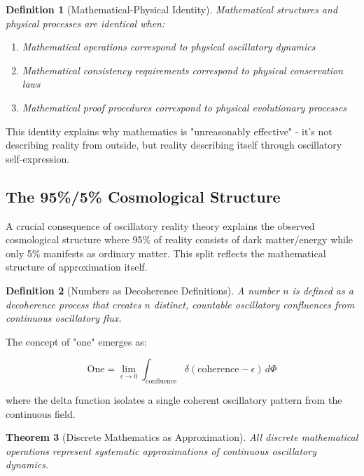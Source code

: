 \documentclass[11pt,a4paper]{article}
\newtheorem{theorem}{Theorem}[section]
\newtheorem{definition}[theorem]{Definition}
\theoremstyle{remark}
\begin{document}
\begin{definition}[Mathematical-Physical Identity]
Mathematical structures and physical processes are identical when:
\begin{enumerate}
\item Mathematical operations correspond to physical oscillatory dynamics
\item Mathematical consistency requirements correspond to physical conservation laws
\item Mathematical proof procedures correspond to physical evolutionary processes
\end{enumerate}
\end{definition}

This identity explains why mathematics is "unreasonably effective" - it's not describing reality from outside, but reality describing itself through oscillatory self-expression.

\subsection{The 95\%/5\% Cosmological Structure}

A crucial consequence of oscillatory reality theory explains the observed cosmological structure where 95\% of reality consists of dark matter/energy while only 5\% manifests as ordinary matter. This split reflects the mathematical structure of approximation itself.

\begin{definition}[Numbers as Decoherence Definitions]
A number $n$ is defined as a decoherence process that creates $n$ distinct, countable oscillatory confluences from continuous oscillatory flux.
\end{definition}

The concept of "one" emerges as:

$$\text{One} = \lim_{\epsilon \to 0} \int_{\text{confluence}} \delta(\text{coherence} - \epsilon) \, d\Phi$$

where the delta function isolates a single coherent oscillatory pattern from the continuous field.

\begin{theorem}[Discrete Mathematics as Approximation]
All discrete mathematical operations represent systematic approximations of continuous oscillatory dynamics.
\end{theorem}
\end{document}
